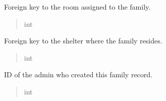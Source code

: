 \documentclass[letterpaper,10pt,english]{sphinxmanual}
\begin{document}
\begin{fulllineitems}
\begin{fulllineitems}
\begin{quote}
\begin{description}
\end{description}\end{quote}

\end{fulllineitems}


\begin{fulllineitems}
\label{\detokenize{app.models:app.models.family.Family.idRoom}}
\pysigstartsignatures
\pysigline
{}
\pysigstopsignatures
\sphinxAtStartPar
Foreign key to the room assigned to the family.
\begin{quote}\begin{description}
\sphinxAtStartPar
int

\end{description}\end{quote}

\end{fulllineitems}


\begin{fulllineitems}
\label{\detokenize{app.models:app.models.family.Family.idShelter}}
\pysigstartsignatures
\pysigline
{}
\pysigstopsignatures
\sphinxAtStartPar
Foreign key to the shelter where the family resides.
\begin{quote}\begin{description}
\sphinxAtStartPar
int

\end{description}\end{quote}

\end{fulllineitems}


\begin{fulllineitems}
\label{\detokenize{app.models:app.models.family.Family.createdBy}}
\pysigstartsignatures
\pysigline
{}
\pysigstopsignatures
\sphinxAtStartPar
ID of the admin who created this family record.
\begin{quote}\begin{description}
\sphinxAtStartPar
int


\end{description}
\end{quote}
\end{fulllineitems}
\end{fulllineitems}
\end{document}
